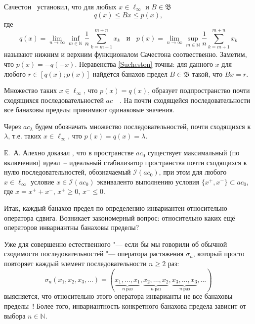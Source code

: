 \documentclass[a4paper,14pt]{article} %
\newcommand{\N}{\ensuremath{\mathbb{N}}}
\newcommand{\Iac}{\mathcal{I}(ac_0)}
\theoremstyle{plain}
\begin{document}
	Сачестон~\cite{sucheston1967banach} установил, что
	для любых $x\in \ell_\infty$ и $B\in\mathfrak{B}$
	\begin{equation}\label{Sucheston}
		q(x) \leqslant Bx \leqslant p(x)
		,
	\end{equation}
	где
	\begin{equation*}
		q(x) = \lim_{n\to\infty} \inf_{m\in\mathbb{N}}  \frac{1}{n} \sum_{k=m+1}^{m+n} x_k
		~~~~\mbox{и}~~~~
		p(x) = \lim_{n\to\infty} \sup_{m\in\mathbb{N}}  \frac{1}{n} \sum_{k=m+1}^{m+n} x_k
	\end{equation*}
	называют нижним и верхним функционалом Сачестона соотвественно.
	Заметим, что $p(x) = -q(-x)$.
	Неравенства \eqref{Sucheston} точны:
	для данного $x$ для любого $r\in[q(x); p(x)]$ найдётся банахов предел
	$B\in\mathfrak{B}$ такой, что $Bx = r$.

Множество таких $x\in\ell_\infty$, что $p(x)=q(x)$,
образует подпространство почти сходящихся последовательностей $ac$~~\cite{lorentz1948contribution}.
На почти сходящейся последовательности все банаховы пределы принимают одинаковые значения.

Через $ac_\lambda$ будем обозначать множество последовательностей, почти сходящихся к $\lambda$,
т.е. таких $x\in\ell_\infty$, что $p(x)=q(x)=\lambda$.

	Е.~А. Алехно  доказал \cite{alekhno2012superposition}, что в пространстве $ac_0$
	существует максимальный (по включению) идеал~-- идеальный
	стабилизатор пространства почти сходящихся к нулю последовательностей,
	обозначаемый $\Iac$,
	при этом для любого $x\in\ell_\infty$ условие $x\in\Iac$
	эквиваленто выполнению условия $\{x^+, x^-\} \subset ac_0$,
	где $x=x^+ + x^-$, $x^+\geq 0$, $x^-\leq 0$.


Итак, каждый банахов предел по определению инвариантен относительно оператора сдвига.
Возникает закономерный вопрос: относительно каких ещё операторов инвариантны банаховы пределы?


Уже для совершенно естественного "--- если бы мы говорили об обычной сходимости последовательностей "---
оператора растяжения $\sigma_n$, который
просто повторяет каждый элемент последовательности $n\geq 2$ раз:
\begin{equation}
	\sigma_n (x_1, x_2, x_3, ...) = (
		\underbrace{x_1,...,x_1}_{n~\text{раз}},
		\underbrace{x_2,...,x_2}_{n~\text{раз}},
		\underbrace{x_3,...,x_3}_{n~\text{раз}},
		...)
\end{equation}
выясняется, что относительно этого оператора инварианты не все банаховы пределы~\cite{TODO}!
Более того, инвариантность конкретного банахова предела зависит от выбора $n\in\N$.
\end{document}
